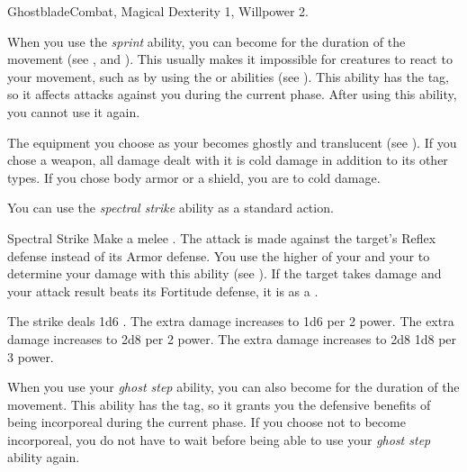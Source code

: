     \begin{magicalfeat}{Ghostblade}{Combat, Magical}
        \featpre Dexterity 1, Willpower 2.

         When you use the \textit{sprint} ability, you can become  for the duration of the movement (see , and ).
        This usually makes it impossible for creatures to react to your movement, such as by using the  or  abilities (see ).
        This ability has the  tag, so it affects attacks against you during the current phase.
        After using this ability, you  cannot use it again.

         The equipment you choose as your  becomes ghostly and translucent (see ).
        If you chose a weapon, all damage dealt with it is cold damage in addition to its other types.
        If you chose body armor or a shield, you are  to cold damage.

         You can use the \textit{spectral strike} ability as a standard action.
        \begin{magicalactiveability}{Spectral Strike}
            \rankline
            Make a melee .
            The attack is made against the target's Reflex defense instead of its Armor defense.
            You use the higher of your  and your  to determine your damage with this ability (see ).
            \hit If the target takes damage and your attack result beats its Fortitude defense, it is \slowed as a .

            \rankline
             The strike deals 1d6 .
             The extra damage increases to 1d6  per 2 power.
             The extra damage increases to 2d8  per 2 power.
             The extra damage increases to 2d8 \add 1d8 per 3 power.
        \end{magicalactiveability}

         When you use your \textit{ghost step} ability, you can also become  for the duration of the movement.
        This ability has the  tag, so it grants you the defensive benefits of being incorporeal during the current phase.
        If you choose not to become incorporeal, you do not have to wait  before being able to use your \textit{ghost step} ability again.


\end{magicalfeat}
